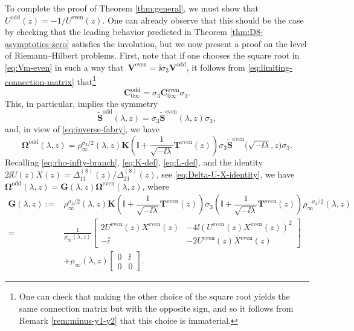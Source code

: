 To complete the proof of Theorem \ref{thm:general}, we must show that $U^{\mathrm{odd}}(z) = -1/U^{\mathrm{even}}(z)$. One can already observe that this should be the case by checking that the leading behavior predicted in Theorem \ref{thm:D8-asymptotics-zero} satisfies the involution, but we now present a proof on the level of Riemann--Hilbert problems. First, note that if one chooses the square root in \eqref{eq:Vm-even} in such a way that~$\mathbf{V}^\mathrm{even} = \ii \sigma_3 \mathbf{V}^\mathrm{odd}$, it follows from \eqref{eq:limiting-connection-matrix} that\footnote{One can check that making the other choice of the square root yields the same connection matrix but with the opposite sign, and so it follows from Remark \ref{rem:minus-y1-y2} that this choice is immaterial.}
\[
 \mathbf{C}_{0\infty}^{\mathrm{odd}} = \sigma_3 \mathbf{C}^{\mathrm{even}}_{0 \infty} \sigma_3.
\]
This, in particular, implies the symmetry
\[
\widetilde{\mathbf{S}}^{\mathrm{odd}}(\lambda, z) = \sigma_3 \widetilde{\mathbf{S}}^{\mathrm{even}}(\lambda, z) \sigma_3,
\]
and, in view of \eqref{eq:inverse-fabry}, we have
\begin{equation}
 \mathbf{\Omega}^{\mathrm{odd}}(\lambda, z) = \rho_\infty^{\sigma_3/2}(\lambda, z) \mathbf{K}\left( \mathbb{I} + \dfrac{1}{\sqrt{-\ii \lambda}} \mathbf{T}^{\mathrm{even}}(z) \right) \sigma_3 \widetilde{\mathbf{S}}^{\mathrm{even}}\big(\sqrt{-\ii \lambda}, z\big) \sigma_3.
 \label{eq:Omega-even-odd}
\end{equation}
Recalling \eqref{eq:rho-infty-branch}, \eqref{eq:K-def}, \eqref{eq:L-def}, and the identity $2\ii U(z)X(z) = \Delta^{(8)}_{11}(z)/\Delta^{(8)}_{21}(z)$, see \eqref{eq:Delta-U-X-identity}, we have~$\mathbf{\Omega}^{\mathrm{odd}}(\lambda, z) = \mathbf{G}(\lambda, z) \mathbf{\Omega}^{\mathrm{even}}(\lambda, z)$, where
\begin{align}
\mathbf{G}(\lambda, z):={}& \rho_\infty^{\sigma_3/2}(\lambda, z) \mathbf{K}\left( \mathbb{I} + \dfrac{1}{\sqrt{-\ii \lambda}} \mathbf{T}^{\mathrm{even}}(z) \right) \sigma_3 \left( \mathbb{I} + \dfrac{1}{\sqrt{-\ii \lambda}} \mathbf{T}^{\mathrm{even}}(z) \right) \rho_\infty^{-\sigma_3/2}(\lambda, z) \nonumber\\
={}& \frac{1}{\rho_\infty(\lambda, z)}\begin{bmatrix} 2U^{\mathrm{even}}(z)X^{\mathrm{even}}(z) & -4\ii (U^{\mathrm{even}}(z) X^{\mathrm{even}}(z))^2 \\ -\ii & -2U^{\mathrm{even}}(z)X^{\mathrm{even}}(z) \end{bmatrix}\nonumber\\
& + \rho_\infty(\lambda, z) \begin{bmatrix}
 0 & \ii \\ 0 & 0
\end{bmatrix}.\label{eq:G-def}
\end{align}
